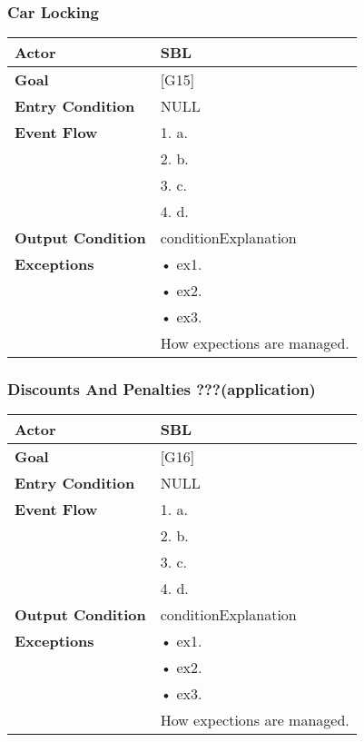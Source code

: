\subsubsection{Car Locking}
\begin{tabular}{| l | p{8cm} |}
\hline
\textbf{Actor}      &       SBL \\
\hline
\textbf{Goal}       &       [G15]\\
\hline
\textbf{Entry Condition} &  NULL\\
\hline
\textbf{Event Flow}     &   1.	a.\\&
                                            2.	b.\\&
                                            3.	c.\\&
                                            4.  d.\\
\hline
\textbf{Output Condition} & conditionExplanation\\
\hline
\textbf{Exceptions} &       •   ex1.\\& 
                            •	ex2.\\&
                            •	ex3.\\& 
                           How expections are managed.\\
\hline
\end{tabular} 


\subsubsection{Discounts And Penalties ???(application)}
\begin{tabular}{| l | p{8cm} |}
\hline
\textbf{Actor}      &       SBL \\
\hline
\textbf{Goal}       &       [G16]\\
\hline
\textbf{Entry Condition} &  NULL\\
\hline
\textbf{Event Flow}     &   1.	a.\\&
                                            2.	b.\\&
                                            3.	c.\\&
                                            4.  d.\\
\hline
\textbf{Output Condition} & conditionExplanation\\
\hline
\textbf{Exceptions} &       •   ex1.\\& 
                            •	ex2.\\&
                            •	ex3.\\& 
                           How expections are managed.\\
\hline
\end{tabular} 


